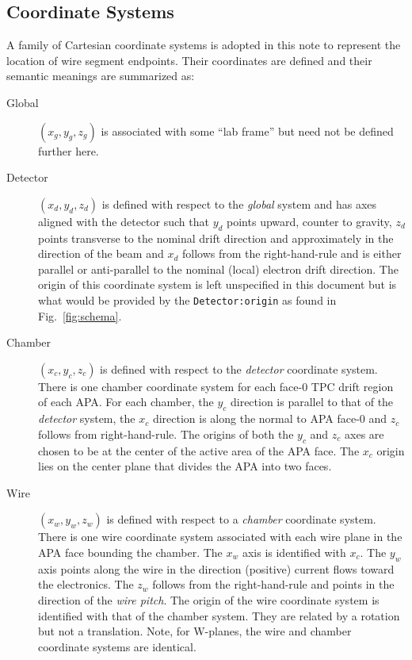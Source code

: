 \documentclass[pdftex,12pt,letter]{article}
\begin{document}
\subsection{Coordinate Systems}
\label{sec:coordsys}

A family of Cartesian coordinate systems is adopted in this note to
represent the location of wire segment endpoints.  Their coordinates
are defined and their semantic meanings are summarized as:

\begin{description}
\item[Global] $(x_g, y_g, z_g)$ is associated with some ``lab frame''
  but need not be defined further here.
\item[Detector] $(x_d, y_d, z_d)$ is defined with respect to the
  \textit{global} system and has axes aligned with the detector such
  that $y_d$ points upward, counter to gravity, $z_d$ points
  transverse to the nominal drift direction and approximately in the
  direction of the beam and $x_d$ follows from the right-hand-rule and
  is either parallel or anti-parallel to the nominal (local) electron
  drift direction.  The origin of this coordinate system is left
  unspecified in this document but is what would be provided by the
  \texttt{Detector:origin} as found in 
  Fig.~\ref{fig:schema}.
\item[Chamber] $(x_c, y_c, z_c)$ is defined with respect to the
  \textit{detector} coordinate system.  There is one chamber
  coordinate system for each face-0 TPC drift region of each APA.  For
  each chamber, the $y_c$ direction is parallel to that of the
  \textit{detector} system, the $x_c$ direction is along the normal to
  APA face-0 and $z_c$ follows from right-hand-rule.  The origins of
  both the $y_c$ and $z_c$ axes are chosen to be at the center of the
  active area of the APA face.  The $x_c$ origin lies on the center
  plane that divides the APA into two faces.  
\item[Wire] $(x_w, y_w, z_w)$ is defined with respect to a
  \textit{chamber} coordinate system.  There is one wire coordinate
  system associated with each wire plane in the APA face bounding the
  chamber.  The $x_w$ axis is identified with $x_c$.  The $y_w$ axis
  points along the wire in the direction (positive) current flows
  toward the electronics.  The $z_w$ follows from the right-hand-rule
  and points in the direction of the \textit{wire pitch}.  The origin
  of the wire coordinate system is identified with that of the chamber
  system.  They are related by a rotation but not a
  translation.  Note, for W-planes, the wire and chamber coordinate
  systems are identical.
\end{description}
\end{document}

